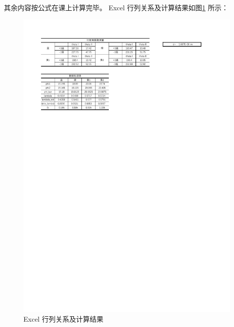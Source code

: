 \documentclass[12pt]{article}
\begin{document}
其余内容按公式在课上计算完毕。
Excel 行列关系及计算结果如图\ref{fig:final_table} 所示：
\begin{figure}[H] %
    \centering
    \includegraphics[width=\textwidth]{./figures/佐证材料.pdf} 
    \caption{Excel 行列关系及计算结果}
    \label{fig:final_table}
\end{figure}
\end{document}
